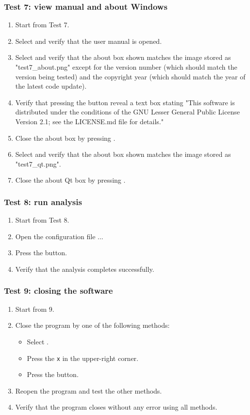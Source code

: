 \subsubsection{Test 7: view manual and about Windows}
\begin{enumerate}
\item Start from Test 7.
\item Select  \textrightarrow {} and verify that the user manual is opened.
\item Select  \textrightarrow {} and verify that the about box shown matches the image stored as "test7\_about.png" except for the version number (which should match the version being tested) and the copyright year (which should match the year of the latest code update).
\item Verify that pressing the  button reveal a text box stating "This software is distributed under the conditions of the GNU Lesser General Public License Version 2.1; see the LICENSE.md file for details."
\item Close the about box by pressing .
\item Select  \textrightarrow {} and verify that the about box shown matches the image stored as "test7\_qt.png".
\item Close the about Qt box by pressing .
\end{enumerate}

\subsubsection{Test 8: run \dflowfm analysis}
\begin{enumerate}
\item Start from Test 8.
\item Open the configuration file ...
\item Press the  button.
\item Verify that the analysis completes successfully.
\end{enumerate}

\subsubsection{Test 9: closing the software}
\begin{enumerate}
\item Start from 9.
\item Close the program by one of the following methods:
\begin{itemize}
\item Select  \textrightarrow {}.
\item Press the \texttt{x} in the upper-right corner.
\item Press the  button.
\end{itemize}
\item Reopen the program and test the other methods.
\item Verify that the program closes without any error using all methods.
\end{enumerate}

